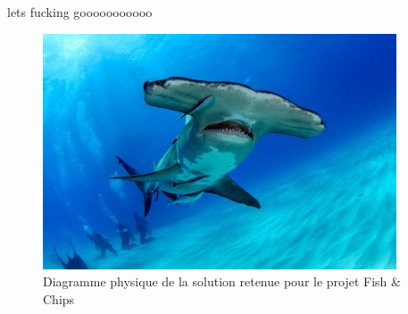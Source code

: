 lets fucking gooooooooooo

\begin{figure}
    \centering
    \includegraphics[width=\linewidth]{fig/requinmarto.jpg}
    \caption{Diagramme physique de la solution retenue pour le projet Fish \& Chips}
    \label{fig:concept_retenu}
\end{figure}

